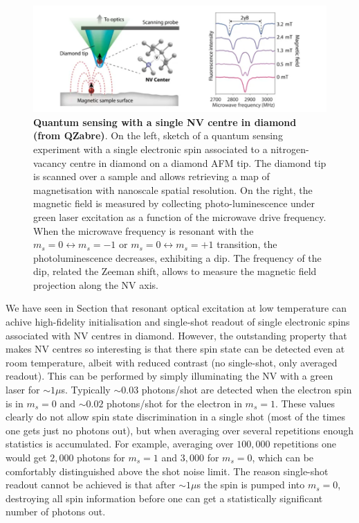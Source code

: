 \documentclass[a4paper,11pt]{article}
\begin{document}
\begin{figure}[h]
\centering
\includegraphics[width = 1\textwidth]{figures/ODMR_sensing.png}
\caption{{\bf Quantum sensing with a single NV centre in diamond (from QZabre)}. On the left, sketch of a quantum sensing experiment with a single electronic spin associated to a nitrogen-vacancy centre in diamond on a diamond AFM tip. The diamond tip is scanned over a sample and allows retrieving a map of magnetisation with nanoscale spatial resolution. On the right, the magnetic field is measured by collecting photo-luminescence under green laser excitation as a function of the microwave drive frequency. When the microwave frequency is resonant with the $m_s = 0 \leftrightarrow m_s = -1$ or $m_s = 0 \leftrightarrow m_s = +1$ transition, the photoluminescence decreases, exhibiting a dip. The frequency of the dip, related the Zeeman shift, allows to measure the magnetic field projection along the NV axis.}
\label{fig:ODMR_sensing}
\end{figure}


We have seen in Section that resonant optical excitation at low temperature can achive high-fidelity initialisation and single-shot readout of single electronic spins associated with NV centres in diamond. However, the outstanding property that makes NV centres so interesting is that there spin state can be detected even at room temperature, albeit with reduced contrast (no single-shot, only averaged readout). This can be performed by simply illuminating the NV with a green laser for $\sim 1 \mu$s. Typically $\sim 0.03$ photons/shot are detected when the electron spin is in $m_s=0$ and $\sim 0.02$ photons/shot for the electron in $m_s=1$. These values clearly do not allow spin state discrimination in a single shot (most of the times one gets just no photons out), but when averaging over several repetitions enough statistics is accumulated. For example, averaging over $100,000$ repetitions one would get $2,000$ photons for $m_s=1$ and $3,000$ for $m_s=0$, which can be comfortably distinguished above the shot noise limit.
\newline The reason single-shot readout cannot be achieved is that after $\sim 1\mu$s the spin is pumped into $m_s=0$, destroying all spin information before one can get a statistically significant number of photons out.
\end{document}
